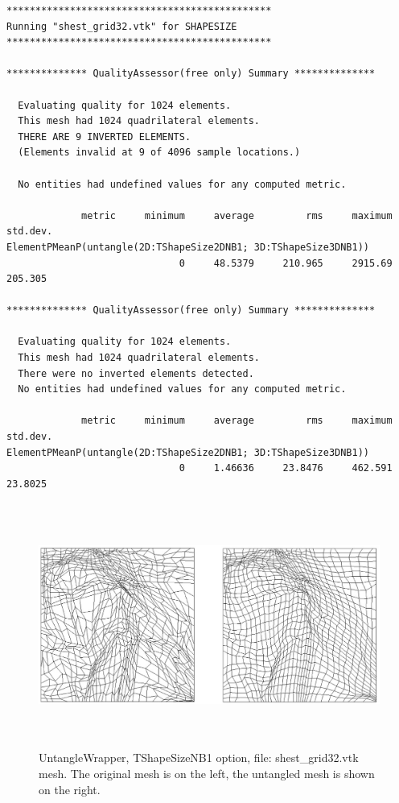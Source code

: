 \begin{verbatim}
**********************************************
Running "shest_grid32.vtk" for SHAPESIZE
**********************************************

************** QualityAssessor(free only) Summary **************

  Evaluating quality for 1024 elements.
  This mesh had 1024 quadrilateral elements.
  THERE ARE 9 INVERTED ELEMENTS.
  (Elements invalid at 9 of 4096 sample locations.)

  No entities had undefined values for any computed metric.

             metric     minimum     average         rms     maximum    std.dev.
ElementPMeanP(untangle(2D:TShapeSize2DNB1; 3D:TShapeSize3DNB1))
                              0     48.5379     210.965     2915.69     205.305

************** QualityAssessor(free only) Summary **************

  Evaluating quality for 1024 elements.
  This mesh had 1024 quadrilateral elements.
  There were no inverted elements detected.
  No entities had undefined values for any computed metric.

             metric     minimum     average         rms     maximum    std.dev.
ElementPMeanP(untangle(2D:TShapeSize2DNB1; 3D:TShapeSize3DNB1))
                              0     1.46636     23.8476     462.591     23.8025
\end{verbatim}


\begin{figure}[htbp]
\begin{center}
    \includegraphics[height=80mm]{shest_grid32.eps}
    \caption{UntangleWrapper, TShapeSizeNB1 option, file: shest\_grid32.vtk mesh. The original mesh is on the left, the untangled mesh is shown on the right.}
    \label{fig:shest_grid32}
\end{center}
\end{figure}


